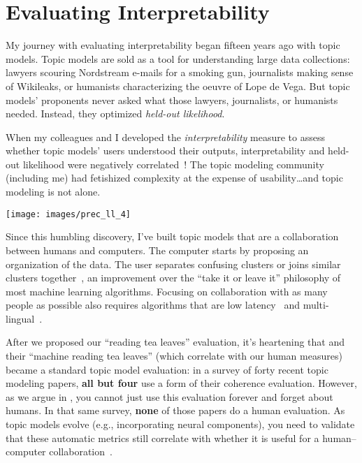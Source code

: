 \section{Evaluating Interpretability}

My journey with evaluating interpretability began fifteen years ago
with topic models.
%
Topic models are sold as a tool for understanding large data
collections: lawyers scouring Nordstream e-mails for a smoking gun,
journalists making sense of Wikileaks, or humanists characterizing the
oeuvre of Lope de Vega.
%
But topic models' proponents never asked what those lawyers,
journalists, or humanists needed.
%
Instead, they optimized \emph{held-out likelihood}.

When my colleagues
and I developed the \emph{interpretability} measure to assess whether topic
models' users understood their outputs, interpretability and
held-out likelihood were negatively correlated~\cite{chang-09b}!
%
The topic modeling community (including me) had fetishized complexity
at the expense of usability\dots and topic modeling is not alone.

\begin{center}
\texttt{[image: images/prec\_ll\_4]}
\end{center}

Since this humbling discovery, I've built topic models that are a
collaboration between humans and computers.  The computer starts by
proposing an organization of the data.  The user separates confusing
clusters or joins similar clusters together~\cite{hu-14:itm}, an
improvement over the ``take it or leave it'' philosophy of most
machine learning algorithms.
%
Focusing on collaboration with as many people as possible also requires algorithms that are low
latency~\cite{lund-17} and
multi-lingual~\cite{Yuan-18}.

After we proposed our ``reading tea leaves'' evaluation, it's
heartening that  and their ``machine reading tea
leaves'' (which correlate with our human measures) became a standard
topic model evaluation: in a survey of forty recent topic modeling
papers, {\bf all but four} use a form of their coherence evaluation.
%
However, as we argue in , you cannot just use this
evaluation forever and forget about humans.
%
In that same survey, {\bf none} of those papers do a human evaluation.
%
As topic models evolve (e.g., incorporating
neural components), you need to validate that these automatic metrics
still correlate with whether it is useful for a human--computer
collaboration~\cite{Li:Mao:Stephens:Goel:Walpole:Fung:Dima:Boyd-Graber-2024}.


